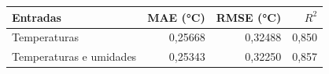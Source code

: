\begin{tabular}{lrrr}
\toprule
Entradas & MAE (°C) & RMSE (°C) & $R^2$ \\
\midrule
Temperaturas & 0,25668 & 0,32488 & 0,850 \\
Temperaturas e umidades & 0,25343 & 0,32250 & 0,857 \\
\bottomrule
\end{tabular}
